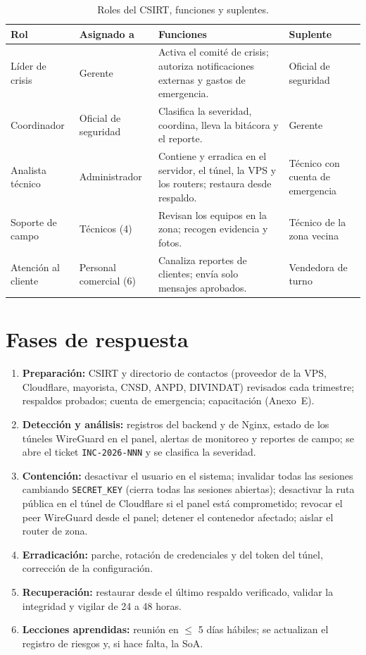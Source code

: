 \begin{table}[H]
\centering
\caption{Roles del CSIRT, funciones y suplentes.}
\label{tab:anx-inc-csirt}
\small
\begin{tabularx}{\textwidth}{L{2.4cm}L{2.6cm}XL{2.6cm}}
\toprule
\textbf{Rol} & \textbf{Asignado a} & \textbf{Funciones} & \textbf{Suplente} \\
\midrule
Líder de crisis & Gerente & Activa el comité de crisis; autoriza notificaciones externas y gastos de emergencia. & Oficial de seguridad \\
Coordinador & Oficial de seguridad & Clasifica la severidad, coordina, lleva la bitácora y el reporte. & Gerente \\
Analista técnico & Administrador & Contiene y erradica en el servidor, el túnel, la VPS y los routers; restaura desde respaldo. & Técnico con cuenta de emergencia \\
Soporte de campo & Técnicos (4) & Revisan los equipos en la zona; recogen evidencia y fotos. & Técnico de la zona vecina \\
Atención al cliente & Personal comercial (6) & Canaliza reportes de clientes; envía solo mensajes aprobados. & Vendedora de turno \\
\bottomrule
\end{tabularx}
\end{table}

\section{Fases de respuesta}

\begin{enumerate}
  \item \textbf{Preparación:} CSIRT y directorio de contactos (proveedor de la VPS,
  Cloudflare, mayorista, CNSD, ANPD, DIVINDAT) revisados cada trimestre; respaldos probados;
  cuenta de emergencia; capacitación (Anexo~E).
  \item \textbf{Detección y análisis:} registros del backend y de Nginx, estado de los túneles
  WireGuard en el panel, alertas de monitoreo y reportes de campo; se abre el ticket
  \texttt{INC-2026-NNN} y se clasifica la severidad.
  \item \textbf{Contención:} desactivar el usuario en el sistema; invalidar todas las sesiones
  cambiando \texttt{SECRET\_KEY} (cierra todas las sesiones abiertas); desactivar la ruta
  pública en el túnel de Cloudflare si el panel está comprometido; revocar el peer WireGuard
  desde el panel; detener el contenedor afectado; aislar el router de zona.
  \item \textbf{Erradicación:} parche, rotación de credenciales y del token del túnel,
  corrección de la configuración.
  \item \textbf{Recuperación:} restaurar desde el último respaldo verificado, validar la
  integridad y vigilar de 24 a 48 horas.
  \item \textbf{Lecciones aprendidas:} reunión en $\leq$ 5 días hábiles; se actualizan el
  registro de riesgos y, si hace falta, la SoA.
\end{enumerate}

